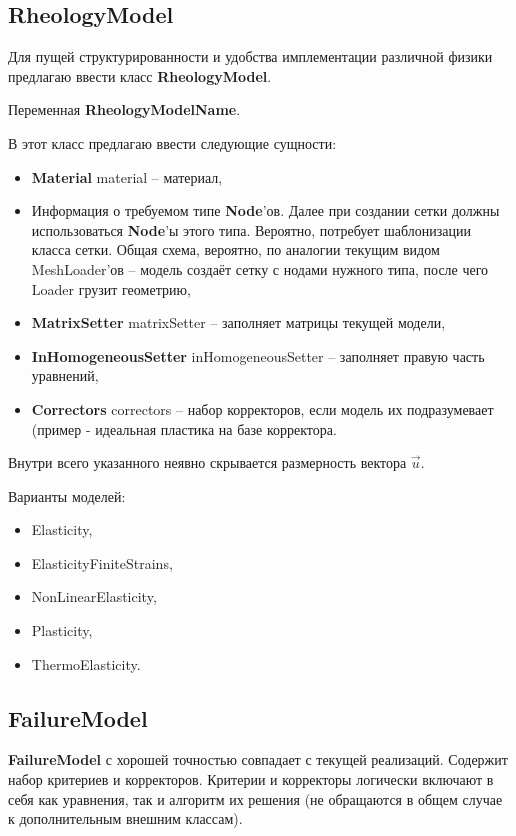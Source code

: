 \documentclass[a4paper,12pt]{article}
\numberwithin{equation}{section}
\begin{document}
\subsection{RheologyModel}
	Для пущей структурированности и удобства имплементации различной физики предлагаю ввести класс \textbf{RheologyModel}.
	
	Переменная \textbf{RheologyModelName}.

	В этот класс предлагаю ввести следующие сущности:
	\begin{itemize}
		\item{\textbf{Material} material -- материал,}
		\item{Информация о требуемом типе \textbf{Node}'ов. Далее при создании сетки должны использоваться \textbf{Node}'ы этого типа. Вероятно, потребует шаблонизации класса сетки. Общая схема, вероятно, по аналогии текущим видом MeshLoader'ов -- модель создаёт сетку с нодами нужного типа, после чего Loader грузит геометрию,}
		\item{\textbf{MatrixSetter} matrixSetter -- заполняет матрицы текущей модели,}
		\item{\textbf{InHomogeneousSetter} inHomogeneousSetter -- заполняет правую часть уравнений,}
		\item{\textbf{Correctors} correctors -- набор корректоров, если модель их подразумевает (пример - идеальная пластика на базе корректора.}
	\end{itemize}

	Внутри всего указанного неявно скрывается размерность вектора $\vec{u}$.
	
	Варианты моделей:
	\begin{itemize}
		\item{Elasticity,}
		\item{ElasticityFiniteStrains,}
		\item{NonLinearElasticity,}
		\item{Plasticity,}
		\item{ThermoElasticity.}
	\end{itemize}
	
\subsection{FailureModel}

	\textbf{FailureModel} с хорошей точностью совпадает с текущей реализаций. Содержит набор критериев и корректоров. Критерии и корректоры логически включают в себя как уравнения, так и алгоритм их решения (не обращаются в общем случае к дополнительным внешним классам). 
	
\end{document}
